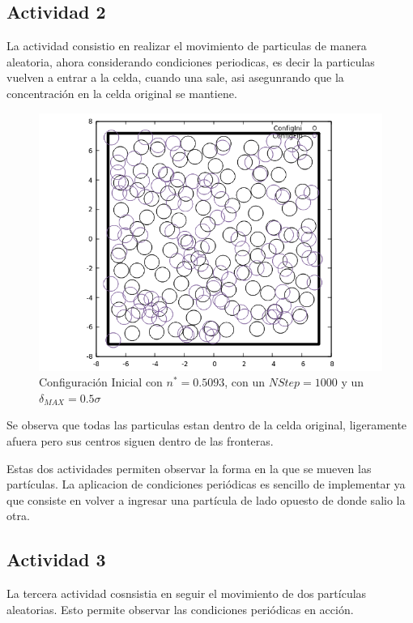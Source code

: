 \documentclass[12pt,letterpaper]{article}
\begin{document}
\subsection*{Actividad 2}
La actividad consistio en realizar el movimiento de particulas de manera aleatoria, ahora considerando condiciones periodicas, es decir la particulas vuelven a entrar a la celda, cuando una sale, asi asegunrando que la concentración en la celda original se mantiene.
\begin{figure}[H]
		\centering
		\includegraphics[scale=0.75]{Config_INI_FIN}
		\caption{Configuración Inicial con $n^*=0.5093$, con un $NStep=1000$ y un $\delta_{MAX}=0.5\sigma$}
	\end{figure}
Se observa que todas las particulas estan dentro de la celda original, ligeramente afuera pero sus centros siguen dentro de las fronteras. 

Estas dos actividades permiten observar la forma en la que se mueven las partículas. La aplicacion de condiciones periódicas es sencillo de implementar ya que consiste en volver a ingresar una partícula de lado opuesto de donde salio la otra.
\subsection*{Actividad 3}
La tercera actividad cosnsistia en seguir el movimiento de dos partículas aleatorias. Esto permite observar las condiciones periódicas en acción.
\end{document}

